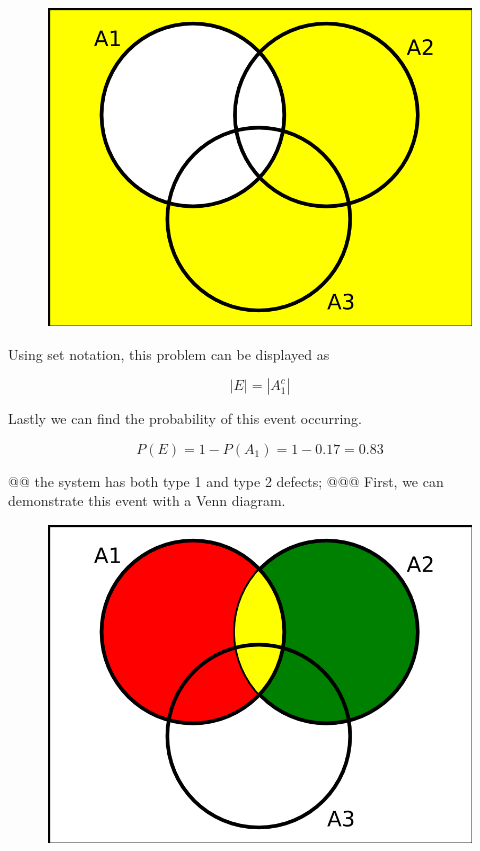 \documentclass[10pt]{article}
\begin{document}
\begin{easylist}[enumerate]
        \begin{figure}[!ht]
            \centering
            \includegraphics[scale=0.3]{./img/ps3_1.png}
        \end{figure}

        Using set notation, this problem can be displayed as

        \[ |E| = |A^c_1| \]

        Lastly we can find the probability of this event occurring.

        \[ P(E) = 1 - P(A_1) = 1 - 0.17 = \boxed{0.83} \]

    @@ the system has both type 1 and type 2 defects;
    @@@ First, we can demonstrate this event with a Venn diagram.

        \begin{figure}[!ht]
            \centering
            \includegraphics[scale=0.3]{./img/ps3_2.png}
        \end{figure}


\end{easylist}
\end{document}
